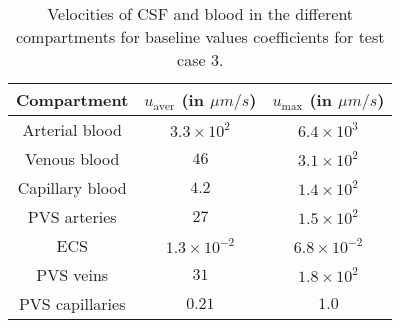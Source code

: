 \documentclass[a4paper,11pt]{article} %
\newcommand{\1}{^{(1)}}
\newcommand{\2}{^{(2)}}
\providecommand{\DIFaddtex}[1]{{\protect\color{blue}\uwave{#1}}} %
\providecommand{\DIFdeltex}[1]{{\protect\color{red}\sout{#1}}}                      %
\providecommand{\DIFaddFL}[1]{\DIFadd{#1}} %
\providecommand{\DIFdelFL}[1]{\DIFdel{#1}} %
\providecommand{\DIFaddbeginFL}{} %
\providecommand{\DIFaddendFL}{} %
\providecommand{\DIFdelbeginFL}{} %
\providecommand{\DIFdelendFL}{} %
\providecommand{\DIFadd}[1]{\texorpdfstring{\DIFaddtex{#1}}{#1}} %
\providecommand{\DIFdel}[1]{\texorpdfstring{\DIFdeltex{#1}}{}} %
\newcommand{\DIFscaledelfig}{0.5}
\newlength{\DIFdelgraphicswidth} %
\newlength{\DIFdelgraphicsheight} %
\newcommand{\DIFaddincludegraphics}[2][]{{\color{blue}\fbox{\DIFOincludegraphics[#1]{#2}}}} %
\newcommand{\DIFdelincludegraphics}[2][]{%
\sbox{\DIFdelgraphicsbox}{\DIFOincludegraphics[#1]{#2}}%
\settoboxwidth{\DIFdelgraphicswidth}{\DIFdelgraphicsbox} %
\settoboxtotalheight{\DIFdelgraphicsheight}{\DIFdelgraphicsbox} %
\scalebox{\DIFscaledelfig}{%
\parbox[b]{\DIFdelgraphicswidth}{\usebox{\DIFdelgraphicsbox}\\[-\baselineskip] \rule{\DIFdelgraphicswidth}{0em}}\llap{\resizebox{\DIFdelgraphicswidth}{\DIFdelgraphicsheight}{%
\setlength{\unitlength}{\DIFdelgraphicswidth}%
\begin{picture}(1,1)%
\thicklines\linethickness{2pt} %
{\color[rgb]{1,0,0}\put(0,0){\framebox(1,1){}}}%
{\color[rgb]{1,0,0}\put(0,0){\line( 1,1){1}}}%
{\color[rgb]{1,0,0}\put(0,1){\line(1,-1){1}}}%
\end{picture}%
}\hspace*{3pt}}} %
} %
\DeclareRobustCommand{\DIFaddbeginFL}{\DIFOaddbeginFL \let\includegraphics\DIFaddincludegraphics} %
\DeclareRobustCommand{\DIFaddendFL}{\DIFOaddendFL \let\includegraphics\DIFOincludegraphics} %
\DeclareRobustCommand{\DIFdelbeginFL}{\DIFOdelbeginFL \let\includegraphics\DIFdelincludegraphics} %
\DeclareRobustCommand{\DIFdelendFL}{\DIFOaddendFL \let\includegraphics\DIFOincludegraphics} %
\begin{document}
\begin{table}[h!]
    \centering
    \begin{tabular}{c|c|c}
       Compartment & $u_\text{aver}$ (in $\si{\mu m/s}$) & $u_\text{max}$ (in $\si{\mu m/s}$) \\
       \hline
        Arterial blood & \DIFdelbeginFL \DIFdelFL{$3.3 \times 10^2$ }\DIFdelendFL \DIFaddbeginFL \DIFaddFL{$3.88 \times 10^3$ }\DIFaddendFL & \DIFdelbeginFL \DIFdelFL{$6.4 \times 10^3$}\DIFdelendFL \DIFaddbeginFL \DIFaddFL{$69 \times 10^3$}\DIFaddendFL \\
        Venous blood & \DIFdelbeginFL \DIFdelFL{$46$ }\DIFdelendFL \DIFaddbeginFL \DIFaddFL{$88 \times 10^1$ }\DIFaddendFL & \DIFdelbeginFL \DIFdelFL{$3.1 \times 10^2$ }\DIFdelendFL \DIFaddbeginFL \DIFaddFL{$5.6 \times 10^3$ }\DIFaddendFL \\
        Capillary blood & \DIFdelbeginFL \DIFdelFL{$4.2$ }\DIFdelendFL \DIFaddbeginFL \DIFaddFL{$1.2$ }\DIFaddendFL & \DIFdelbeginFL \DIFdelFL{$1.4 \times 10^2$}\DIFdelendFL \DIFaddbeginFL \DIFaddFL{$28$}\DIFaddendFL \\
        PVS arteries & \DIFdelbeginFL \DIFdelFL{$27$ }\DIFdelendFL \DIFaddbeginFL \DIFaddFL{$0.69$ }\DIFaddendFL & \DIFdelbeginFL \DIFdelFL{$1.5 \times 10^2$ }\DIFdelendFL \DIFaddbeginFL \DIFaddFL{$5.8$ }\DIFaddendFL \\
        ECS &  \DIFdelbeginFL \DIFdelFL{$1.3 \times 10^{-2}$ }\DIFdelendFL \DIFaddbeginFL \DIFaddFL{$4.3 \times 10^{-3}$ }\DIFaddendFL & \DIFdelbeginFL \DIFdelFL{$6.8 \times 10^{-2} $ }\DIFdelendFL \DIFaddbeginFL \DIFaddFL{$ 7.1  \times 10^{-2} $ }\DIFaddendFL \\
        PVS veins & \DIFdelbeginFL \DIFdelFL{$31$ }\DIFdelendFL \DIFaddbeginFL \DIFaddFL{$2.7$ }\DIFaddendFL & \DIFdelbeginFL \DIFdelFL{$1.8\times 10^2$ }\DIFdelendFL \DIFaddbeginFL \DIFaddFL{$18$ }\DIFaddendFL \\
        PVS capillaries & \DIFdelbeginFL \DIFdelFL{$0.21$ }\DIFdelendFL \DIFaddbeginFL \DIFaddFL{$2.8\times 10^{-3}$ }\DIFaddendFL & \DIFdelbeginFL \DIFdelFL{$1.0$
    }\DIFdelendFL \DIFaddbeginFL \DIFaddFL{$1.9 \times 10^{-2}$
    }\DIFaddendFL \end{tabular}
    \caption{Velocities of CSF and blood in the different compartments for baseline values coefficients for test case 3.}
    \label{tab:velocities-withblood}
\end{table}
\end{document}
